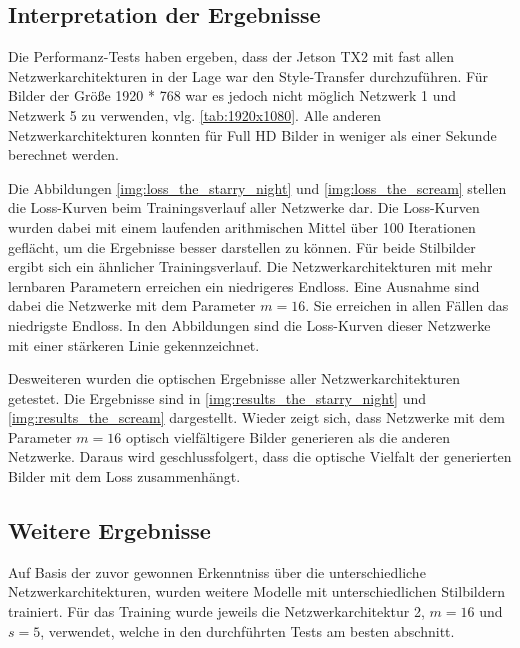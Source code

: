 \subsection{Interpretation der Ergebnisse}

Die Performanz-Tests haben ergeben, dass der Jetson TX2 mit fast allen Netzwerkarchitekturen in der Lage war den Style-Transfer durchzuführen. Für Bilder der Größe 1920 * 768  war es jedoch nicht möglich Netzwerk 1 und Netzwerk 5 zu verwenden, vlg. \ref{tab:1920x1080}. Alle anderen Netzwerkarchitekturen konnten für Full HD Bilder in weniger als einer Sekunde berechnet werden.

Die Abbildungen \ref{img:loss_the_starry_night} und \ref{img:loss_the_scream} stellen die Loss-Kurven beim Trainingsverlauf aller Netzwerke dar. Die Loss-Kurven wurden dabei mit einem laufenden arithmischen Mittel über 100 Iterationen geflächt, um die Ergebnisse besser darstellen zu können. Für beide Stilbilder ergibt sich ein ähnlicher Trainingsverlauf. Die Netzwerkarchitekturen mit mehr lernbaren Parametern erreichen ein niedrigeres Endloss. Eine Ausnahme sind dabei die Netzwerke mit dem Parameter $ m = 16 $. Sie erreichen in allen Fällen das niedrigste Endloss. In den Abbildungen sind die Loss-Kurven dieser Netzwerke mit einer stärkeren Linie gekennzeichnet.

Desweiteren wurden die optischen Ergebnisse aller Netzwerkarchitekturen getestet. Die Ergebnisse sind in \ref{img:results_the_starry_night} und \ref{img:results_the_scream} dargestellt. Wieder zeigt sich, dass Netzwerke mit dem Parameter $ m = 16 $ optisch vielfältigere Bilder generieren als die anderen Netzwerke. Daraus wird geschlussfolgert, dass die optische Vielfalt der generierten Bilder mit dem Loss zusammenhängt.

\subsection{Weitere Ergebnisse}

Auf Basis der zuvor gewonnen Erkenntniss über die unterschiedliche Netzwerkarchitekturen, wurden weitere Modelle mit unterschiedlichen Stilbildern trainiert. Für das Training wurde jeweils die Netzwerkarchitektur 2, $ m = 16 $ und $ s = 5 $, verwendet, welche in den durchführten Tests am besten abschnitt.